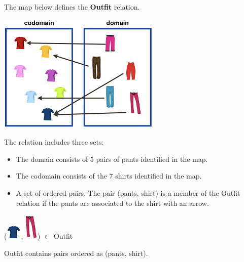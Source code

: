 \documentclass{ximera}
\begin{document}
\begin{definition}
  The map below defines the \textbf{Outfit} relation. 
  
  

    \includegraphics[width=293px,height=215px]{pics/r17.png}

  
 

  The  relation includes three sets:
    \begin{itemize}
    \item The domain consists of 5 pairs of pants identified in the map.
    \item The codomain consists of the 7 shirts identified in the map.
    \item A set of ordered pairs. The pair (pants, shirt) is a member of the Outfit relation if the pants are associated to the shirt with an arrow.
    \end{itemize}

  
  
\end{definition}



\begin{exercise}

 ({\includegraphics[width=28px,height=27px]{pics/elements/shirts/shirts7.png}}, {\includegraphics[width=24px,height=47px]{pics/elements/pants/pants6.png}}) $\in$ Outfit 

  \begin{multipleChoice}
  \end{multipleChoice}
  \begin{feedback}
Outfit contains pairs ordered as (pants, shirt).
  \end{feedback}
\end{exercise}
\end{document}
